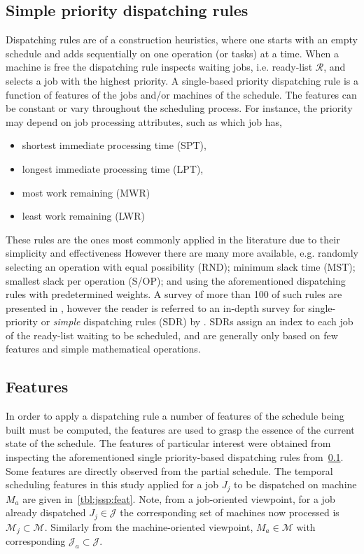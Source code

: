 \documentclass[smallextended]{svjour3}
\begin{document}
\subsection{Simple priority dispatching rules}\label{ch:dispatchrules}
Dispatching rules are of a construction heuristics, where one starts with an empty schedule and adds sequentially on one operation (or tasks) at a time. When a machine is free the dispatching rule inspects waiting jobs, i.e. ready-list $\mathcal{R}$, and selects a job with the highest priority. A single-based priority dispatching rule is a function of features of the jobs and/or machines of the schedule. The features can be constant or vary throughout the scheduling process. For instance, the priority may depend on job processing attributes, such as which job has, 
\begin{itemize}
\item shortest immediate processing time (SPT),  
\item longest immediate processing time (LPT), 
\item most work remaining (MWR) 
\item least work remaining (LWR)
\end{itemize}
These rules are the ones most commonly applied in the literature due to their simplicity and effectiveness %
However there are many more available, e.g. randomly selecting an operation with equal possibility (RND); minimum slack time (MST); smallest slack per operation (S/OP); and using the aforementioned dispatching rules with predetermined weights. A survey of more than 100 of such rules are presented in \citet{Panwalkar77}, however the reader is referred to an in-depth survey for single-priority or \emph{simple} dispatching rules (SDR) by \citet{Haupt89}. 
SDRs assign an index to each job of the ready-list waiting to be scheduled, and are generally only based on few features and simple mathematical operations. 


\subsection{Features}
In order to apply a dispatching rule a number of features of the schedule being built must be computed, the features are used to grasp the essence of the current state of the schedule. The features of particular interest were obtained from inspecting the aforementioned single priority-based dispatching rules from~\cref{ch:dispatchrules}. Some features are directly observed from the partial schedule. The  temporal scheduling features in this study applied for a job $J_j$ to be dispatched on machine $M_a$ are given in~\cref{tbl:jssp:feat}.  
Note, from a job-oriented viewpoint, for a job already dispatched $J_j\in\mathcal{J}$ the corresponding set of machines now processed is $\mathcal{M}_j\subset\mathcal{M}$. Similarly from the machine-oriented viewpoint, $M_a\in\mathcal{M}$ with corresponding $\mathcal{J}_a\subset\mathcal{J}$. 
\end{document}
